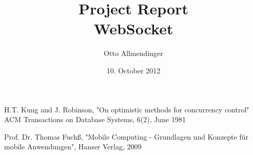 \documentclass[pdftex,a4paper]{report}
\begin{document}
\begin{titlepage}

\title{Project Report\\WebSocket}
\author{Otto Allmendinger}
\date{10. October 2012}
\maketitle

\end{titlepage}

\tableofcontents










\begin{thebibliography}{9}

    H.T. Kung and J. Robinson, "On optimistic methods for concurrency control"
    ACM Transactions on Database Systems, 6(2), June 1981

    Prof. Dr. Thomas Fuchß, "Mobile Computing - Grundlagen und Konzepte für
    mobile Anwendungen", Hanser Verlag, 2009

\end{thebibliography}
\end{document}
